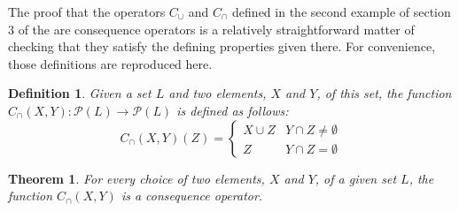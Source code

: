 \documentclass[12pt]{article}
\newtheorem{definition}{Definition}
\newtheorem{theorem}{Theorem}
\begin{document}
The proof that the operators $C_\cup$ and $C_\cap$ defined in the second 
example of section 3 of the
 are consequence operators 
is a relatively straightforward matter of checking that they satisfy the defining properties given there.  For convenience, those definitions are
reproduced here.

\begin{definition}
Given a set $L$ and two elements, $X$ and $Y$, of this set, the 
function $C_\cap (X,Y) \colon \mathcal{P}(L) \to \mathcal{P}(L)$ 
is defined as follows:
 \[
  C_\cap (X,Y) (Z) = 
  \begin{cases} 
   X \cup Z & Y \cap Z \not= \emptyset \\ 
   Z & Y \cap Z = \emptyset 
  \end{cases} 
 \]
\end{definition}

\begin{theorem} 
For every choice of two elements, $X$ and $Y$, of a given set $L$, the 
function $C_\cap (X,Y)$ is a consequence operator. 
\end{theorem}
\end{document}
